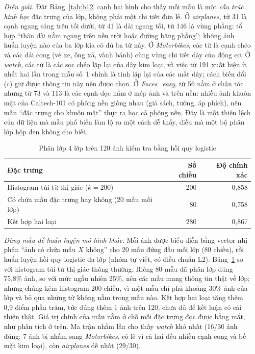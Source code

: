 \emph{Diễn giải.} Đặt Bảng~\ref{tab:b12} cạnh hai hình cho thấy mỗi mẫu là một \emph{cấu trúc hình học} đặc trưng của lớp, không phải một chi tiết đơn lẻ.
Ở \emph{airplanes}, từ 31 là cạnh ngang sáng trên tối dưới, từ 41 là dải ngang tối, từ 146 là vùng phẳng: tổ hợp ``thân dài nằm ngang trên nền trời hoặc đường băng phẳng''; không ảnh huấn luyện nào của ba lớp kia có đủ ba từ này.
Ở \emph{Motorbikes}, các từ là cạnh chéo và các dải cong (vè xe, ống xả, vành bánh) cùng vùng chi tiết dày của động cơ.
Ở \emph{watch}, các từ là các sọc chéo lặp lại của dây kim loại, và việc từ 191 xuất hiện ít nhất hai lần trong mẫu số~1 chính là tính lặp lại của các mắt dây; cách biến đổi (c) giữ được thông tin này nên được chọn.
Ở \emph{Faces\_easy}, từ 56 nằm ở chân tóc nhưng từ 73 và 113 là các cạnh dọc nằm ở mép ảnh và trên nền: nhiều ảnh khuôn mặt của Caltech-101 có phông nền giống nhau (giá sách, tường, áp phích), nên mẫu ``đặc trưng cho khuôn mặt'' thực ra học cả phông nền. Đây là một thiên lệch của dữ liệu mà mẫu phổ biến làm lộ ra một cách dễ thấy, điều mà một bộ phân lớp hộp đen không cho biết.

\begin{table}[t]
\caption{Phân lớp 4 lớp trên 120 ảnh kiểm tra bằng hồi quy logistic}
\label{tab:b13}
\centering
\footnotesize
\begin{tabular}{@{}p{4.5cm}rr@{}}
\toprule
Đặc trưng & Số chiều & Độ chính xác \\
\midrule
Histogram túi từ thị giác ($k = 200$) & 200 & 0,858 \\
Có chứa mẫu đặc trưng hay không (20 mẫu mỗi lớp) & 80 & 0,758 \\
Kết hợp hai loại & 280 & 0,867 \\
\bottomrule
\end{tabular}
\end{table}

\emph{Dùng mẫu để huấn luyện mô hình khác.} Mỗi ảnh được biểu diễn bằng vector nhị phân ``ảnh có chứa mẫu $X$ không'' cho 20 mẫu đứng đầu mỗi lớp (80 chiều), rồi huấn luyện hồi quy logistic đa lớp (nhóm tự viết, có điều chuẩn L2). Bảng~\ref{tab:b13} so với histogram túi từ thị giác thông thường. Riêng 80 mẫu đã phân lớp đúng 75,8\% ảnh, so với mức ngẫu nhiên 25\%, nên các mẫu mang thông tin thật về lớp; nhưng chúng kém histogram 200 chiều, vì một mẫu chỉ phủ khoảng 30\% ảnh của lớp và bỏ qua những từ không nằm trong mẫu nào. Kết hợp hai loại tăng thêm 0,9 điểm phần trăm, tức đúng thêm 1 ảnh trên 120, chưa đủ để kết luận có cải thiện thật. Giá trị chính của mẫu nằm ở chỗ mỗi đặc trưng đọc được bằng mắt, như phân tích ở trên. Ma trận nhầm lẫn cho thấy \emph{watch} khó nhất (16/30 ảnh đúng; 7 ảnh bị nhầm sang \emph{Motorbikes}, có lẽ vì cả hai đều nhiều cạnh cong và bề mặt kim loại), còn \emph{airplanes} dễ nhất (29/30).

